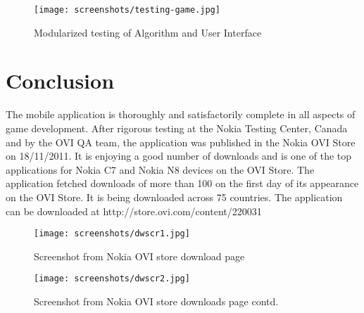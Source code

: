 \documentclass[a4paper,12pt]{article}
\begin{document}

\begin{figure}[htp]
\centering
\texttt{[image: screenshots/testing-game.jpg]}
\caption{Modularized testing of Algorithm and User Interface}
\end{figure}


\newpage
\section{Conclusion}
\hspace{18pt}The mobile application is thoroughly and satisfactorily complete in all aspects of game development. After rigorous testing at the Nokia Testing Center, Canada and by the OVI QA team, the application was published in the Nokia OVI Store on 18/11/2011. It is enjoying a good number of downloads and is one of the top applications for Nokia C7 and Nokia N8 devices on the OVI Store. The application fetched downloads of more than 100 on the first day of its appearance on the OVI Store. It is being downloaded across 75 countries. The application can be downloaded at http://store.ovi.com/content/220031
\begin{figure}[htp]
\centering
\texttt{[image: screenshots/dwscr1.jpg]}
\caption{Screenshot from Nokia OVI store download page}
\end{figure}

\newpage
\begin{figure}[htp]
\centering
\texttt{[image: screenshots/dwscr2.jpg]}
\caption{Screenshot from Nokia OVI store downloads page contd.}
\end{figure}

                                                                                                          

\newpage
\end{document}
